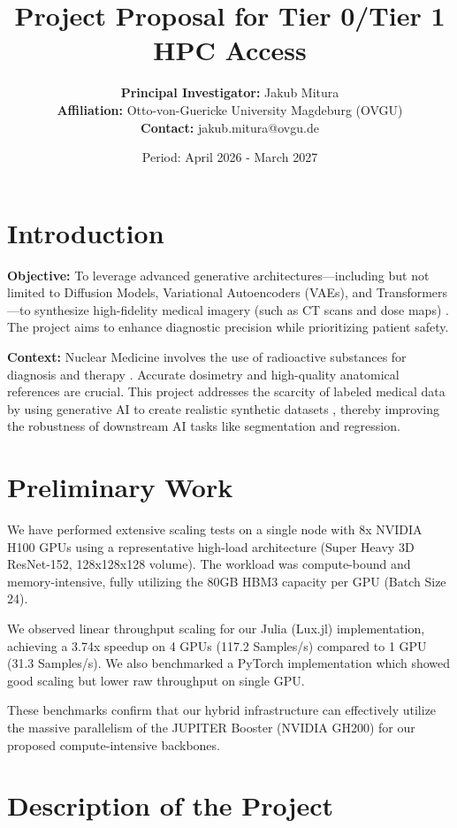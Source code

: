 \documentclass[11pt,a4paper]{article}
\title{\textbf{Project Proposal for Tier 0/Tier 1 HPC Access}}
\author{\textbf{Principal Investigator:} Jakub Mitura \\
\textbf{Affiliation:} Otto-von-Guericke University Magdeburg (OVGU) \\
\textbf{Contact:} jakub.mitura@ovgu.de}
\date{Period: April 2026 - March 2027}
\begin{document}
\maketitle
\thispagestyle{fancy}
\tableofcontents
\newpage

\section{Introduction}
\label{sec:intro}
\textbf{Objective:} To leverage advanced generative architectures—including but not limited to Diffusion Models, Variational Autoencoders (VAEs), and Transformers—to synthesize high-fidelity medical imagery (such as CT scans and dose maps) \cite{KazerouniAghdam2022, SanchezTsaftaris2022}. The project aims to enhance diagnostic precision while prioritizing patient safety.

\textbf{Context:} Nuclear Medicine involves the use of radioactive substances for diagnosis and therapy \cite{DulleaOSullivan2025}. Accurate dosimetry and high-quality anatomical references are crucial. This project addresses the scarcity of labeled medical data by using generative AI to create realistic synthetic datasets \cite{StauffenbergPoyet2024}, thereby improving the robustness of downstream AI tasks like segmentation and regression.

\section{Preliminary Work}
\label{sec:prelim}
We have performed extensive scaling tests on a single node with 8x NVIDIA H100 GPUs using a representative high-load architecture (Super Heavy 3D ResNet-152, 128x128x128 volume). The workload was compute-bound and memory-intensive, fully utilizing the 80GB HBM3 capacity per GPU (Batch Size 24).

We observed linear throughput scaling for our Julia (Lux.jl) implementation, achieving a 3.74x speedup on 4 GPUs (117.2 Samples/s) compared to 1 GPU (31.3 Samples/s). We also benchmarked a PyTorch implementation which showed good scaling but lower raw throughput on single GPU.

These benchmarks confirm that our hybrid infrastructure can effectively utilize the massive parallelism of the JUPITER Booster (NVIDIA GH200) for our proposed compute-intensive backbones.

\section{Description of the Project}
\label{sec:desc}
\end{document}
